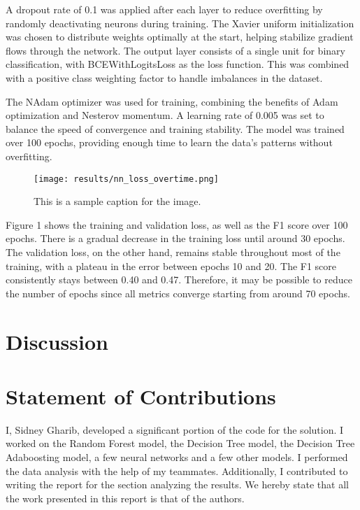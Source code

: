 \documentclass{article} %
\begin{document}
A dropout rate of 0.1 was applied after each layer to reduce overfitting by randomly deactivating neurons during training. The Xavier uniform initialization was chosen to distribute weights optimally at the start, helping stabilize gradient flows through the network. The output layer consists of a single unit for binary classification, with BCEWithLogitsLoss as the loss function. This was combined with a positive class weighting factor to handle imbalances in the dataset.

The NAdam optimizer was used for training, combining the benefits of Adam optimization and Nesterov momentum. A learning rate of 0.005 was set to balance the speed of convergence and training stability. The model was trained over 100 epochs, providing enough time to learn the data's patterns without overfitting.


\begin{figure}[ht!]
   \centering
   \texttt{[image: results/nn\_loss\_overtime.png]}
   \caption{This is a sample caption for the image.}
   \label{fig:sample-image}
\end{figure}

Figure 1 shows the training and validation loss, as well as the F1 score over 100 epochs. There is a gradual decrease in the training loss until around 30 epochs. The validation loss, on the other hand, remains stable throughout most of the training, with a plateau in the error between epochs 10 and 20. The F1 score consistently stays between 0.40 and 0.47. Therefore, it may be possible to reduce the number of epochs since all metrics converge starting from around 70 epochs.


\section{Discussion}

\section{Statement of Contributions}
\label{others}

I, Sidney Gharib, developed a significant portion of the code for the solution.
I worked on the Random Forest model, the Decision Tree model, the Decision Tree Adaboosting model, a few neural networks and a few other models.
I performed the data analysis with the help of my teammates. Additionally, I contributed to writing the report for the section analyzing the results.
We hereby state that all the work presented in this report is that of the authors.
\end{document}
